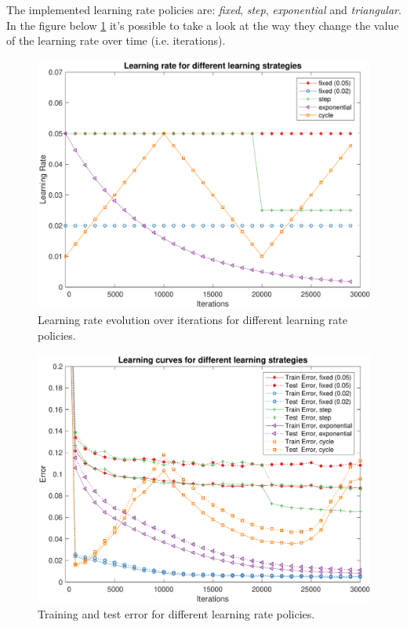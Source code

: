 The implemented learning rate policies are: \textit{fixed}, \textit{step}, \textit{exponential} and \textit{triangular}.
In the figure below \cref{fig:learning_rates_policies} it's possible to take a look at the way they change the value of the learning rate over time (i.e. iterations).


\begin{figure}
	\centering
	\includegraphics[width=\columnwidth]{figures/learning_rates}
	\caption{Learning rate evolution over iterations for different learning rate policies.}
	\label{fig:learning_rates_policies}
\end{figure}

\begin{figure}
	\centering
	\includegraphics[width=\columnwidth]{figures/error_strategies.pdf}
	\caption{Training and test error for different learning rate policies.}
	\label{fig:lrp_training_error}
\end{figure}
